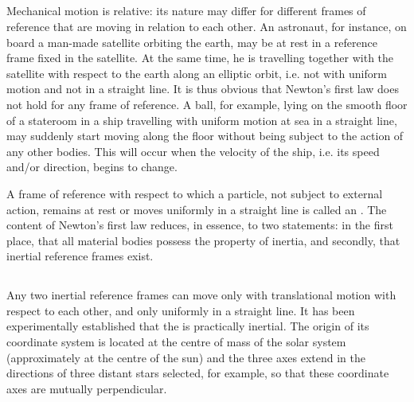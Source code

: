 \subsection{}\label{2.1.2}Mechanical motion is relative: its nature may differ for different frames of reference  that are moving in relation to each other. An astronaut, for instance, on board a man-made satellite orbiting the earth, may be at rest in a reference frame fixed in the satellite. At the same time, he is travelling together with the satellite with respect to the earth along an elliptic or­bit, i.e. not with uniform motion and not in a straight line. It is thus obvious that Newton's first law does not hold for any frame of reference. A ball, for example, lying on the smooth floor of a stateroom in a ship travelling with uniform motion at sea in a straight line, may suddenly start moving along the floor without being subject to the action of any other bodies. This will occur when the velocity of the ship, i.e. its speed and/or direction, begins to change.

A frame of reference with respect to which a particle, not sub­ject to external action, remains at rest or moves uniformly in a straight line is called an . The content of Newton's first law reduces, in essence, to two statements: in the first place, that all material bodies possess the property of inertia, and secondly, that inertial reference frames exist.


\subsection{}\label{2.1.3}Any two inertial reference frames can move only with translational motion with respect to each other, and only uniformly in a straight line. It has been experimentally established that the  is practically inertial. The origin of its coordinate system is located at the centre of mass  of the solar system (approximately at the centre of the sun) and the three axes extend in the directions of three dis­tant stars selected, for example, so that these coordinate axes are mutually perpendicular.

